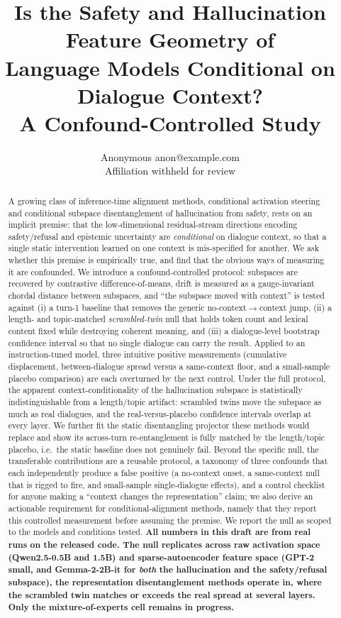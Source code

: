 \documentclass{article}
\title{Is the Safety and Hallucination Feature Geometry of \\ Language Models Conditional on Dialogue Context? \\ A Confound-Controlled Study}
\author{\name Anonymous \email anon@example.com \\ \addr Affiliation withheld for review}
\begin{document}
\maketitle

\begin{abstract}
A growing class of inference-time alignment methods, conditional activation
steering and conditional subspace disentanglement of hallucination from safety,
rests on an implicit premise: that the low-dimensional residual-stream directions
encoding safety/refusal and epistemic uncertainty are \emph{conditional} on dialogue
context, so that a single static intervention learned on one context is
mis-specified for another. We ask whether this premise is empirically true, and find
that the obvious ways of measuring it are confounded. We introduce a confound-controlled
protocol: subspaces are recovered by contrastive difference-of-means, drift is measured
as a gauge-invariant chordal distance between subspaces, and ``the subspace moved with
context'' is tested against (i) a turn-1 baseline that removes the generic
no-context$\to$context jump, (ii) a length- and topic-matched \emph{scrambled-twin}
null that holds token count and lexical content fixed while destroying coherent
meaning, and (iii) a dialogue-level bootstrap confidence interval so that no single
dialogue can carry the result. Applied to an instruction-tuned model, three intuitive
positive measurements (cumulative displacement, between-dialogue spread versus a
same-context floor, and a small-sample placebo comparison) are each overturned by the
next control. Under the full protocol, the apparent context-conditionality of the
hallucination subspace is statistically indistinguishable from a length/topic artifact:
scrambled twins move the subspace as much as real dialogues, and the real-versus-placebo
confidence intervals overlap at every layer. We further fit the static disentangling
projector these methods would replace and show its across-turn re-entanglement is fully
matched by the length/topic placebo, i.e.\ the static baseline does not genuinely fail. Beyond the specific null, the transferable
contributions are a reusable protocol, a taxonomy of three confounds that each
independently produce a false positive (a no-context onset, a same-context null that is
rigged to fire, and small-sample single-dialogue effects), and a control checklist for
anyone making a ``context changes the representation'' claim; we also derive an actionable
requirement for conditional-alignment methods, namely that they report this controlled
measurement before assuming the premise. We report the null as scoped to the models and
conditions tested. \textbf{All numbers in this draft are from
real runs on the released code. The null replicates across raw activation space (Qwen2.5-0.5B
and 1.5B) and sparse-autoencoder feature space (GPT-2 small, and Gemma-2-2B-it for \emph{both}
the hallucination and the safety/refusal subspace), the representation disentanglement methods
operate in, where the scrambled twin matches or exceeds the real spread at several layers. Only
the mixture-of-experts cell remains in progress.}
\end{abstract}
\end{document}
